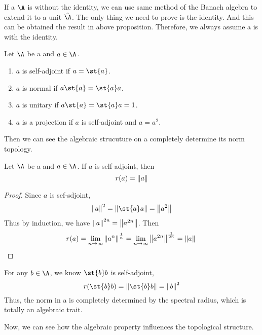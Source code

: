 If a \Cs $\A$ is without the identity, we can use same method of the Banach algebra to extend it to a unit \Cs $\tilde{\A}$. The only thing we need to prove is the identity. And this can be obtained the result in above proposition. Therefore, we always assume a \Cs is with the identity.

\begin{defn}
	Let $\A$ be a \Cs and $a \in \A$.
	\begin{enumerate}[label=\arabic*)]
		\item $a$ is self-adjoint if $a = \st{a}$.
		\item $a$ is normal if $a\st{a} = \st{a}a$.
		\item $a$ is unitary if $a\st{a}=\st{a}a=1$.
		\item $a$ is a projection if $a$ is self-adjoint and $a=a^{2}$.
	\end{enumerate}
\end{defn}

Then we can see the algebraic strucuture on a \Cs completely determine its norm topology.

\begin{thm}
	Let $\A$ be a \Cs and $a \in \A$. If $a$ is self-adjoint, then
	\begin{equation*}
		r(a) = \left\lVert a\right\lVert
	\end{equation*}
\end{thm}
\begin{proof}
	Since $a$ is sef-sdjoint,
	\begin{equation*}
		\norm{a}^{2} = \norm{\st{a}a} = \norm{a^{2}}
	\end{equation*}
	Thus by induction, we have $\left\lVert a\right\lVert^{2n} = \left\lVert a^{2n}\right\lVert$. Then
	\begin{equation*}
		r(a) = \lim_{n \rightarrow \infty} \left\lVert a^{n}\right\lVert^{\frac{1}{n}} = \lim_{n \rightarrow \infty} \left\lVert a^{2n}\right\lVert^{\frac{1}{2n}} = \left\lVert a\right\lVert \qedhere
	\end{equation*}
\end{proof}
\begin{rem}
	For any $b \in \A$, we know $\st{b}b$ is self-adjoint,
	\begin{equation*}
		r(\st{b}b) = \norm{\st{b}b} = \norm{b}^{2}
	\end{equation*}
	Thus, the norm in a \Cs is completely determined by the spectral radius, which is totally an algebraic trait.
\end{rem}

Now, we can see how the algebraic property influences the topological structure.

